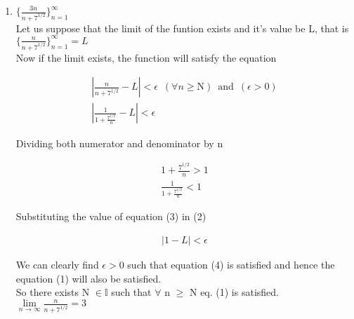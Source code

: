 \documentclass[11pt, letterpaper]{article}
\begin{document}
\begin{enumerate}
{\begin{enumerate}
{			\begin{center}
				Substituting the value of (3) in (2)
			\end{center}
			
			\begin{eqnarray}
				\left| n - L \right| < \epsilon
			\end{eqnarray}
			
			\begin{center}
				We can now clearly see that for any value of $\epsilon$ $\left| n - L \right|$ would be greater than that of $\epsilon$, hence limit does not exist and the function diverges\\
			$\lim \limits_{n \to \infty} \frac{n^2}{n + 5} = +\infty$
			\end{center}
			}
			\item{$\lbrace \frac{3n}{n+7^{1/2}} \rbrace_{n=1}^\infty$\\
			Let us suppose that the limit of the funtion exists and it's value be L, that is \\
			$ \lbrace \frac{n}{n+7^{1/2}} \rbrace_{n=1}^\infty = L$\\
			Now if the limit exists, the function will satisfy the equation\\
			
			\setcounter{equation}{0}
			
			\begin{eqnarray}
				\left| \frac{n}{n + 7^{1/2}} - L\right| < \epsilon \,\,\, (\forall n \geq \mathrm{N}) \,\,\, \mathrm{and} \,\,\, (\epsilon > 0)\\
				\left| \frac{1}{1 + \frac{7^{1/2}}{n}} - L\right| < \epsilon 
			\end{eqnarray}
			}
			
			Dividing both numerator and denominator by n
			
			\begin{eqnarray}
				1 + \frac{7^{1/2}}{n} > 1 \nonumber \\
				\frac{1}{1 + \frac{7^{1/2}}{n}} < 1 
			\end{eqnarray}
			
			Substituting the value of equation (3) in (2)
			
			\begin{eqnarray}
				\left|1 - L \right| < \epsilon 
			\end{eqnarray}
			
			We can clearly find $\epsilon > 0$ such that equation (4) is satisfied and hence the equation (1) will also be satisfied.\\
			So there exists N $\in \mathbb{I}$ such that $\forall$ n $\geq$ N eq. (1) is satisfied.\\
			$\lim \limits_{n \to \infty} \frac{n}{n+ 7^{1/2}} = 3$
			

\end{enumerate}}
\end{enumerate}
\end{document}
